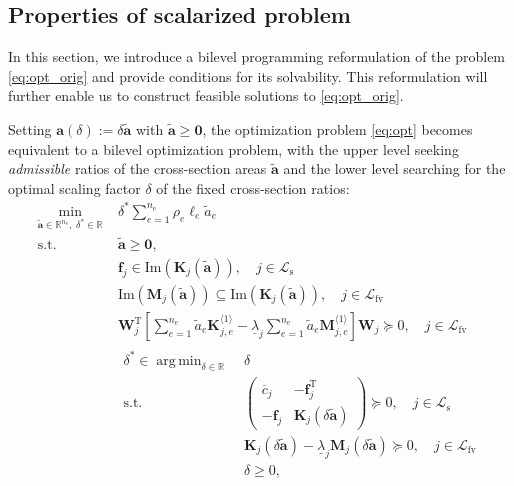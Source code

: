 \documentclass[final,onefignum,onetabnum]{siamart220329}
\DeclareMathOperator*{\argmin}{arg\,min}
\begin{document}
\subsection{Properties of scalarized problem}\label{sec:scalar}
In this section, we introduce a bilevel programming reformulation of the problem \eqref{eq:opt_orig} and provide conditions for its solvability. This reformulation will further enable us to construct feasible solutions to \eqref{eq:opt_orig}.

Setting $\mathbf{a}(\delta) := \delta \tilde{\mathbf{a}}$ with $\tilde{\mathbf{a}}\ge \mathbf{0}$, the optimization problem \eqref{eq:opt} becomes equivalent to a bilevel optimization problem, with the upper level seeking \textit{admissible} ratios of the cross-section areas $\tilde{\mathbf{a}}$ and the lower level searching for the optimal scaling factor $\delta$ of the fixed cross-section ratios:
%
\begin{subequations}\label{eq:bilevel}
	\begin{align}
		\min_{\tilde{\mathbf{a}}\in \mathbb{R}^{n_{\mathrm{e}}}\!,\; \delta^*\in\mathbb{R}}\; & \delta^* \sum_{e=1}^{n_\mathrm{e}} \rho_e \ell_e \tilde{a}_e\\
		\mathrm{s.t.}\ & \tilde{\mathbf{a}} \ge \mathbf{0},\label{eq:bilevel-atilde}\\
		& \mathbf{f}_j \in \mathrm{Im}\left(\mathbf{K}_j(\tilde{\mathbf{a}})\right), \quad j \in {\mathcal{L}_\mathrm{s}}\label{eq:bilevel_static}\\
		& \mathrm{Im}\left(\mathbf{M}_{j}(\tilde{\mathbf{a}})\right) \subseteq \mathrm{Im}\left(\mathbf{K}_{j}(\tilde{\mathbf{a}})\right),\quad j \in {\mathcal{L}_\mathrm{fv}}\label{eq:bilevel_mass}\\
		& \mathbf{W}_j^\mathrm{T}\left[ \sum_{e=1}^{n_\mathrm{e}}\tilde{a}_e\mathbf{K}_{j,e}^{\langle 1\rangle} - \underline{\lambda}_j \sum_{e=1}^{n_\mathrm{e}} \tilde{a}_e \mathbf{M}_{j,e}^{\langle 1\rangle} \right]\mathbf{W}_j \succeq 0, \quad j \in {\mathcal{L}_\mathrm{fv}}\label{eq:bilevel-membraine}\\
		& \begin{aligned}\label{eq:bilevel-lower}
			\delta^* \in \argmin_{\delta\in\mathbb{R}}\; & \delta\\
			\mathrm{s.t.}\; & \begin{pmatrix}
				\overline{c}_j & -\mathbf{f}_j^\mathrm{T}\\
				-\mathbf{f}_j & \mathbf{K}_j (\delta \tilde{\mathbf{a}})
			\end{pmatrix} \succeq 0, \quad j \in {\mathcal{L}_\mathrm{s}}\\
			& \mathbf{K}_j(\delta \tilde{\mathbf{a}}) - \underline{\lambda}_j \mathbf{M}_j(\delta \tilde{\mathbf{a}}) \succeq 0, \quad j \in {\mathcal{L}_\mathrm{fv}}\\
			& \delta \ge 0,
		\end{aligned}
	\end{align}
\end{subequations}
\end{document}
